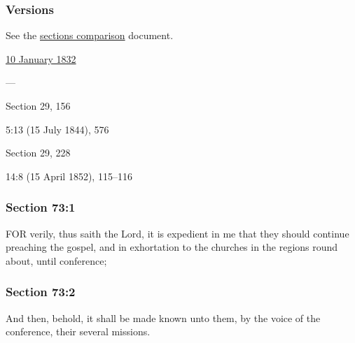 	\subsubsection{Versions}
		\label{DC73-V}
		
		See the \href{https://drive.google.com/file/d/1goAvNz8jS4R8slYfMG_db55Ty2z_vmgK/view?usp=sharing}{sections comparison} document.
	
		\begin{compactdesc}
			\item[JSP] \hyperref[EMS-1832-JS-10-JAN-1832]{10 January 1832}
			\item[BC] ---
			\item[DC 1835] Section 29, 156
			\item[TS] 5:13 (15 July 1844), 576
			\item[DC 1844] Section 29, 228
			\item[MS] 14:8 (15 April 1852), 115--116
		\end{compactdesc}

	\subsubsection{Section 73:1} %
		\label{DC73-1}

		FOR verily, thus saith the Lord, it is expedient in me that they should continue preaching the gospel, and in exhortation to the churches in the regions round about, until conference;


	\subsubsection{Section 73:2} %
		\label{DC73-2}

		And then, behold, it shall be made known unto them, by the voice of the conference, their several missions.



